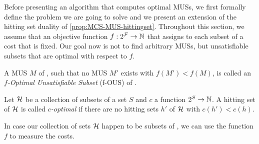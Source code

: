 
Before presenting an algorithm that computes optimal MUSs, we first formally define the problem we are going to solve and we present an extension of the hitting set duality of \cref{prop:MCS-MUS-hittingset}. 
Throughout this section, we assume that an objective function $f: 2^{\mathcal{F}}  \to \mathbb{N}$ that assigns to each subset of \formula a cost that is fixed. Our goal now is not to find arbitrary MUSs, but unsatisfiable subsets that are optimal with respect to $f$. 



\begin{definition}
  A MUS $M$ of \formula, such that no MUS $M'$ exists with $f(M')<f(M)$, is called an \emph{$f$-Optimal Unsatisfiable Subset} (f-OUS) of \formula.
\end{definition}

\begin{definition}
  Let $\mathcal{H}$ be a collection of subsets of a set $S$ and $c$ a function $2^S\to\mathbb{N}$. 
  A hitting set of $\mathcal{H}$ is called \emph{$c$-optimal} if there are no hitting sets $h'$ of $\mathcal{H}$ with $c(h')<c(h)$. 
\end{definition}
In case our collection of sets $\mathcal{H}$ happen to be subsets of \formula, we can use the function $f$ to measure the costs. 
% 


